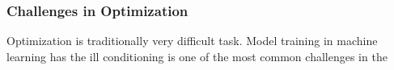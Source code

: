 \subsubsection{Challenges in Optimization}

Optimization is traditionally very difficult task. Model training in machine learning has 
the ill conditioning is one of the most common challenges in the 